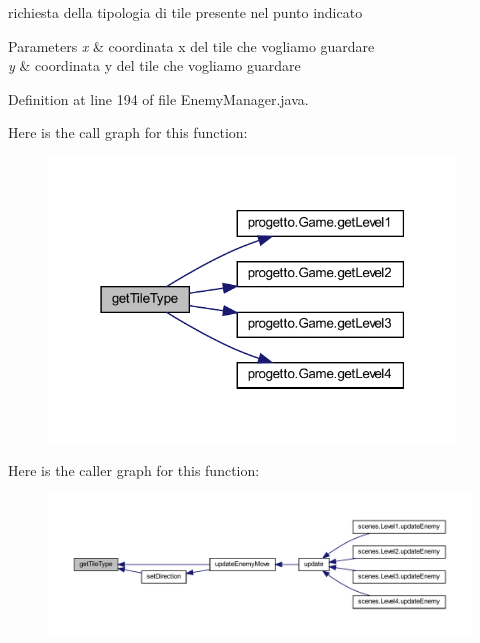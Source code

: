 richiesta della tipologia di tile presente nel punto indicato 


\begin{DoxyParams}{Parameters}
{\em x} & coordinata x del tile che vogliamo guardare \\
\hline
{\em y} & coordinata y del tile che vogliamo guardare \\
\hline
\end{DoxyParams}


Definition at line 194 of file Enemy\+Manager.\+java.

Here is the call graph for this function\+:\nopagebreak
\begin{figure}[H]
\begin{center}
\leavevmode
\includegraphics[width=307pt]{classmanagers_1_1_enemy_manager_ac689e72523c8460ac3160526d310b1b7_cgraph}
\end{center}
\end{figure}
Here is the caller graph for this function\+:
\nopagebreak
\begin{figure}[H]
\begin{center}
\leavevmode
\includegraphics[width=350pt]{classmanagers_1_1_enemy_manager_ac689e72523c8460ac3160526d310b1b7_icgraph}
\end{center}
\end{figure}
\mbox{\label{classmanagers_1_1_enemy_manager_afec98871c0e021759b9d0afc8b690a18}} 
